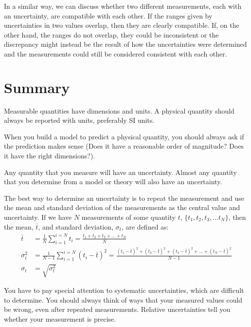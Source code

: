 In a similar way, we can discuss whether two different measurements, each with an uncertainty, are compatible with each other. If the ranges given by uncertainties in two values overlap, then they are clearly compatible. If, on the other hand, the ranges do not overlap, they could be inconsistent or the discrepancy might instead be the result of how the uncertainties were determined and the measurements could still be considered consistent with each other. 

\newpage
\section{Summary}
\vspace{0.5cm}
%
\begin{chapterSummary}
Measurable quantities have dimensions and units. A physical quantity should always be reported with units, preferably SI units.

When you build a model to predict a physical quantity, you should always ask if the prediction makes sense (Does it have a reasonable order of magnitude? Does it have the right dimensions?).

Any quantity that you measure will have an uncertainty. Almost any quantity that you determine from a model or theory will also have an uncertainty.

The best way to determine an uncertainty is to repeat the measurement and use the mean and standard deviation of the measurements as the central value and uncertainty. 
If we have $N$ measurements of some quantity $t$, $\{t_1, t_2, t_3, \dots t_N\}$, then the mean, $\bar t$, and standard deviation, $\sigma_t$, are defined as:
\begin{align*}
\bar t &= \frac{1}{N}\sum_{i=1}^{i=N} t_i=\frac{t_1 +t_2 +t_3 +\dots+ t_N}{N} \\
\sigma_t^2 &=\frac{1}{N-1}\sum_{i=1}^{i=N}(t_i-\bar t)^2 = \frac{(t_1-\bar t)^2+(t_2-\bar t)^2+(t_3-\bar t)^2+\dots+(t_N-\bar t)^2}{N-1} \\
\sigma_t &=\sqrt{\sigma_t^2}
\end{align*}

You have to pay special attention to systematic uncertainties, which are difficult to determine. You should always think of ways that your measured values could be wrong, even after repeated measurements. Relative uncertainties tell you whether your measurement is precise.


\end{chapterSummary}
